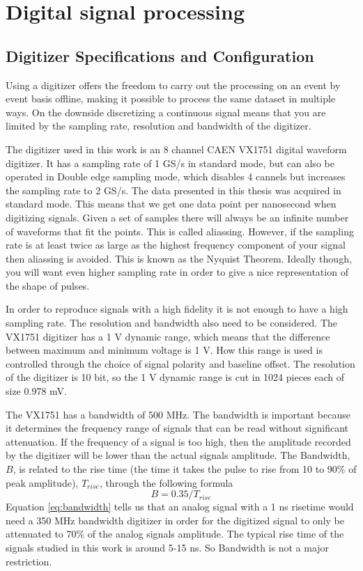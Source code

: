 \documentclass[main.tex]{subfiles}
\begin{document}
\section{Digital signal processing}
\subsection{Digitizer Specifications and Configuration}
Using a digitizer offers the freedom to carry out the processing on an event by event basis offline, making it possible to process the same dataset in multiple ways. On the downside discretizing a continuous signal means that you are limited by the sampling rate, resolution and bandwidth of the digitizer.

The digitizer used in this work is an 8 channel CAEN VX1751 digital waveform digitizer. It has a sampling rate of 1 GS/s in standard mode, but can also be operated in Double edge sampling mode, which disables 4  cannels but increases the sampling rate to 2 GS/s\cite[p.9]{CAEN}. The data presented in this thesis was acquired in standard mode. This means that we get one data point per nanosecond when digitizing signals. Given a set of samples there will always be an infinite number of waveforms that fit the points. This is called aliassing. However, if the sampling rate is at least twice as large as the highest frequency component of your signal then aliassing is avoided. This is known as the Nyquist Theorem. Ideally though, you will want even higher sampling rate in order to give a nice representation of the shape of pulses\cite{Spectrum}. %

In order to reproduce signals with a high fidelity it is not enough to have a high sampling rate. The resolution and bandwidth also need to be considered. The VX1751 digitizer has a 1 V dynamic range, which means that the difference between maximum and minimum voltage is 1 V. How this range is used is controlled through the choice of signal polarity and baseline offset. The resolution of the digitizer is 10 bit, so the 1 V dynamic range is cut in 1024 pieces each of size 0.978 mV\cite{CAEN}. 

The VX1751 has a bandwidth of 500 MHz. The bandwidth is important because it determines the frequency range of signals that can be read without significant attenuation. If the frequency of a signal is too high, then the amplitude recorded by the digitizer will be lower than the actual signals amplitude. The Bandwidth, $B$, is related to the rise time (the time it takes the pulse to rise from 10 to 90\% of peak amplitude), $T_{rise}$, through the following formula\cite[p.354]{Leo}
\begin{equation}
\label{eq:bandwidth}
B=0.35/T_{rise}
\end{equation}
Equation \ref{eq:bandwidth} tells us that an analog signal with a 1 ns risetime would need a 350 MHz bandwidth digitizer in order for the digitized signal to only be attenuated to 70\% of the analog signals amplitude. The typical rise time of the signals studied in this work is around 5-15 ns. So Bandwidth is not a major restriction.
\end{document}
